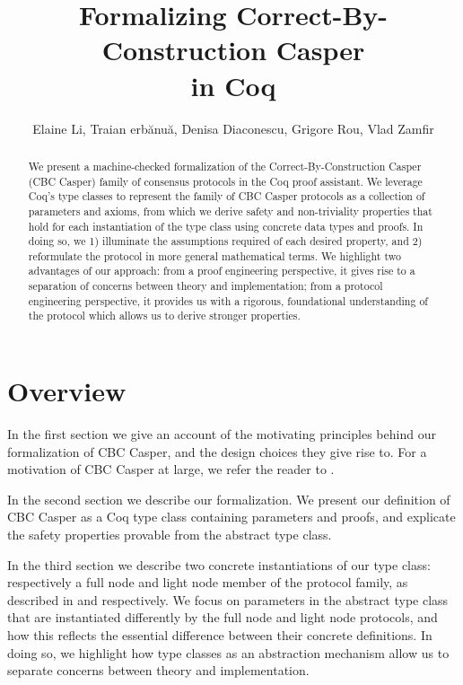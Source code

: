 \documentclass[runningheads]{llncs}
\begin{document}
	
\title{Formalizing Correct-By-Construction Casper \\ in Coq}

\author{Elaine Li, Traian erbănuă, Denisa Diaconescu, Grigore Rou, Vlad Zamfir}

\maketitle

\begin{abstract}
We present a machine-checked formalization of the Correct-By-Construction Casper (CBC Casper) family of consensus protocols in the Coq proof assistant. We leverage Coq's type classes to represent the family of CBC Casper protocols as a collection of parameters and axioms, from which we derive safety and non-triviality properties that hold for each instantiation of the type class using concrete data types and proofs. In doing so, we 1) illuminate the assumptions required of each desired property, and 2) reformulate the protocol in more general mathematical terms. We highlight two advantages of our approach: from a proof engineering perspective, it gives rise to a separation of concerns between theory and implementation; from a protocol engineering perspective, it provides us with a rigorous, foundational understanding of the protocol which allows us to derive stronger properties. 
\end{abstract}

\section{Overview} 
In the first section we give an account of the motivating principles behind our formalization of CBC Casper, and the design choices they give rise to. For a motivation of CBC Casper at large, we refer the reader to \cite{CBCfull}. 

In the second section we describe our formalization. We present our definition of CBC Casper as a Coq type class containing parameters and proofs, and explicate the safety properties provable from the abstract type class. 

In the third section we describe two concrete instantiations of our type class: respectively a full node and light node member of the protocol family, as described in \cite{CBCfull} and \cite{CBClight} respectively. We focus on parameters in the abstract type class that are instantiated differently by the full node and light node protocols, and how this reflects the essential difference between their concrete definitions. In doing so, we highlight how type classes as an abstraction mechanism allow us to separate concerns between theory and implementation. 
\end{document}

